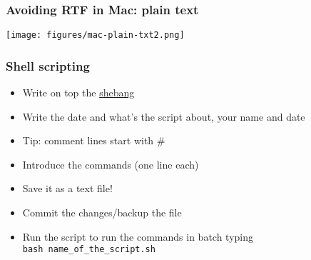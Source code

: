 \documentclass{beamer}
\begin{document}
\begin{frame}
  \frametitle{Avoiding RTF in Mac: plain text}
\centering
\texttt{[image: figures/mac-plain-txt2.png]}
\end{frame}






\begin{frame}
  \frametitle{Shell scripting}
  \begin{itemize}
  \item Write on top the \href{https://en.wikipedia.org/wiki/Shebang_(Unix)}{shebang}
  \item Write the date and what's the script about, your name and date
  \item Tip: comment lines start with \#
  \item Introduce the commands (one line each)
  \item Save it as a text file!
  \item Commit the changes/backup the file
  \item Run the script to run the commands in batch typing \texttt{bash\ name\_of\_the\_script.sh}
  \end{itemize}

  
\end{frame}


\end{document}
